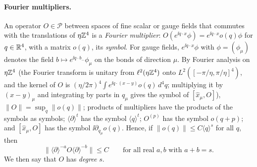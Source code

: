\paragraph{Fourier multipliers.} An operator $O\in\mathscr P$ between spaces of fine scalar or gauge fields that commutes with the translations of $\eta\mathbb Z^4$ is a \emph{Fourier multiplier}: $O(e^{\ii q\cdot x}\phi)=e^{\ii q\cdot x}o(q)\phi$ for $q\in\mathbb R^4$, with a matrix $o(q)$, its \emph{symbol}. For gauge fields, $e^{\ii q\cdot x}\phi$ with $\phi=(\phi_\mu)$ denotes the field $b\mapsto e^{\ii q\cdot b_-}\phi_\mu$ on the bonds of direction $\mu$. By Fourier analysis on $\eta\mathbb Z^4$ (the Fourier transform is unitary from $\ell^2(\eta\mathbb Z^4)$ onto $L^2([-\pi/\eta,\pi/\eta]^4)$, and the kernel of $O$ is $(\eta/2\pi)^4\int e^{\ii q\cdot(x-y)}o(q)\,d^4q$; multiplying it by $(x-y)_\mu$ and integrating by parts in $q_\mu$ gives the symbol of $[\hat x_\mu,O]$), $\|O\|=\sup_q\|o(q)\|$; products of multipliers have the products of the symbols as symbols; $\langle\partial\rangle^t$ has the symbol $\langle q\rangle^t$; $O^{(p)}$ has the symbol $o(q+p)$; and $[\hat x_\mu,O]$ has the symbol $\ii\partial_{q_\mu}o(q)$. Hence, if $\|o(q)\|\le C\langle q\rangle^s$ for all $q$, then
\begin{equation}\label{eq:ol-multiplier-order}
\|\langle\partial\rangle^{-a}O\langle\partial\rangle^{-b}\|\le C\qquad\text{for all real $a,b$ with $a+b=s$.}
\end{equation}
We then say that $O$ has \emph{degree} $s$.

